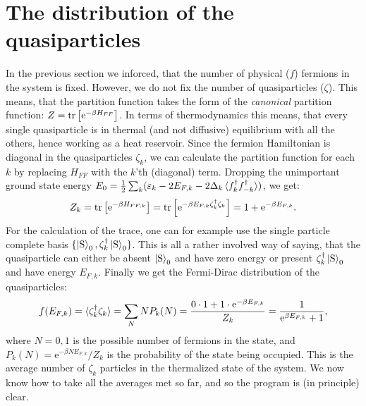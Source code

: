 \section{The distribution of the quasiparticles}
In the previous section we inforced, that the number of physical ($f$) fermions in the system is fixed. However, we do not fix the number of quasiparticles ($\zeta$). This means, that the partition function takes the form of the \textit{canonical} partition function: $Z = \operatorname{tr}\left[\text{e}^{-\beta H_{FF}}\right]$. In terms of thermodynamics this means, that every single quasiparticle is in thermal (and not diffusive) equilibrium with all the others, hence working as a heat reservoir. Since the fermion Hamiltonian is diagonal in the quasiparticles $\zeta_k$, we can calculate the partition function for each $k$ by replacing $H_{FF}$ with the $k$'th (diagonal) term. Dropping the unimportant ground state energy $E_0 = \frac{1}{2}\sum_k (\varepsilon_k-2E_{F,k}-2\Delta_k\braket {f^\dagger_k f^\dagger_{-k}})$, we get:
\begin{equation}
Z_k = \operatorname{tr}\left[\text{e}^{-\beta H_{FF,k}}\right] = \operatorname{tr}\left[\text{e}^{-\beta E_{F,k}\zeta^\dagger_k\zeta_k }\right] = 1 + \text{e}^{-\beta E_{F,k}}. 
\end{equation}     
For the calculation of the trace, one can for example use the single particle complete basis $\{\ket{\text{S}}_0, \zeta^\dagger_k\ket{\text{S}}_0\}$. This is all a rather involved way of saying, that the quasiparticle can either be absent $\ket{\text{S}}_0$ and have zero energy or present $\zeta^\dagger_k\ket{\text{S}}_0$ and have energy $E_{F,k}$. Finally we get the Fermi-Dirac distribution of the quasiparticles:
\begin{equation}
f(E_{F,k}) = \braket {\zeta^\dagger_k\zeta_k} = \sum_N N P_k(N) = \frac{0\cdot 1 + 1 \cdot \text{e}^{-\beta E_{F,k}} }{Z_k} = \frac{1}{\text{e}^{\beta E_{F,k}} + 1}, 
\end{equation}
where $N=0,1$ is the possible number of fermions in the state, and $P_k(N) = \text{e}^{-\beta N E_{F,k}}/Z_k$ is the probability of the state being occupied\cite{PlischkeStatPhys,SchroederThermal}. This is the average number of $\zeta_k$ particles in the thermalized state of the system. We now know how to take all the averages met so far, and so the program is (in principle) clear.  

